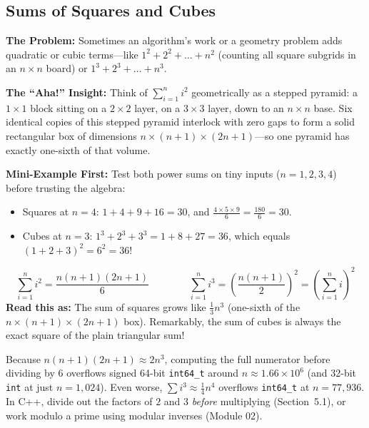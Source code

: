 \documentclass[11pt,a4paper]{article}
\theoremstyle{definition}
\newcommand{\painbeat}{\textbf{\color{accentamber}The Problem:} }
\newcommand{\ahabeat}{\textbf{\color{accentteal}The ``Aha!'' Insight:} }
\newcommand{\examplebeat}{\textbf{\color{primaryblue}Mini-Example First:} }
\begin{document}
\subsection{Sums of Squares and Cubes}

\painbeat Sometimes an algorithm's work or a geometry problem adds quadratic or cubic terms---like $1^2 + 2^2 + \dots + n^2$ (counting all square subgrids in an $n \times n$ board) or $1^3 + 2^3 + \dots + n^3$.

\ahabeat Think of $\sum_{i=1}^{n} i^2$ geometrically as a stepped pyramid: a $1 \times 1$ block sitting on a $2 \times 2$ layer, on a $3 \times 3$ layer, down to an $n \times n$ base. Six identical copies of this stepped pyramid interlock with zero gaps to form a solid rectangular box of dimensions $n \times (n + 1) \times (2n + 1)$---so one pyramid has exactly one-sixth of that volume.

\examplebeat Test both power sums on tiny inputs ($n = 1, 2, 3, 4$) before trusting the algebra:
\begin{itemize}
    \item Squares at $n = 4$: $1 + 4 + 9 + 16 = 30$, and $\frac{4 \times 5 \times 9}{6} = \frac{180}{6} = 30$.
    \item Cubes at $n = 3$: $1^3 + 2^3 + 3^3 = 1 + 8 + 27 = 36$, which equals $(1 + 2 + 3)^2 = 6^2 = 36$!
\end{itemize}

\begin{formulabox}
\[
    \sum_{i=1}^{n} i^2 = \frac{n(n+1)(2n+1)}{6}
    \qquad\qquad
    \sum_{i=1}^{n} i^3 = \left(\frac{n(n+1)}{2}\right)^2 = \left(\sum_{i=1}^{n} i\right)^2
\]
\textbf{Read this as:} The sum of squares grows like $\frac{1}{3}n^3$ (one-sixth of the $n \times (n+1) \times (2n+1)$ box). Remarkably, the sum of cubes is always the exact square of the plain triangular sum!
\end{formulabox}

\begin{watchoutbox}
Because $n(n+1)(2n+1) \approx 2n^3$, computing the full numerator before dividing by $6$ overflows signed 64-bit \texttt{int64\_t} around $n \approx 1.66 \times 10^6$ (and 32-bit \texttt{int} at just $n = 1{,}024$). Even worse, $\sum i^3 \approx \frac{1}{4}n^4$ overflows \texttt{int64\_t} at $n = 77{,}936$. In C++, divide out the factors of $2$ and $3$ \emph{before} multiplying (Section~5.1), or work modulo a prime using modular inverses (Module 02).
\end{watchoutbox}
\end{document}
